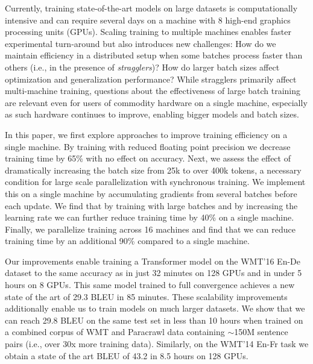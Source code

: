 \documentclass[11pt,a4paper]{article}
\newcommand{\mamark}[1]{\textcolor{orange}{{#1}}}
\begin{document}
Currently, training state-of-the-art models on large datasets is computationally intensive and can require several days on a machine with 8 high-end graphics processing units (GPUs). Scaling training to multiple machines enables faster experimental turn-around but also introduces new challenges:
How do we maintain efficiency in a distributed setup when some batches process faster than others (i.e., in the presence of \emph{stragglers})?
How do larger batch sizes affect optimization and generalization performance?
While stragglers primarily affect multi-machine training, questions about the effectiveness of large batch training are relevant even for users of commodity hardware on a single machine, especially as such hardware continues to improve, enabling bigger models and batch sizes.

In this paper, we first explore approaches to improve training efficiency on a single machine.
By training with reduced floating point precision we decrease training time by 65\% with no effect on accuracy.
Next, we assess the effect of dramatically increasing the batch size from 25k to over 400k tokens, a necessary condition for large scale parallelization with synchronous training.
We implement this on a single machine by accumulating gradients from several batches before each update.
We find that by training with large batches and by increasing the learning rate we can further reduce training time by 40\% on a single machine.
Finally, we parallelize training across 16 machines and find that we can reduce training time by an additional 90\% compared to a single machine.

Our improvements enable training a Transformer model on the WMT'16 En-De dataset to the same accuracy as \citet{vaswani2017transformer} in just 32 minutes on 128 GPUs and in under 5 hours on 8 GPUs.
This same model trained to full convergence achieves a new state of the art of 29.3 BLEU in 85 minutes.
These scalability improvements additionally enable us to train models on much larger datasets.
We show that we can reach 29.8 BLEU on the same test set in less than 10 hours when trained on a combined corpus of WMT and Paracrawl data containing $\sim$150M sentence pairs (i.e., over 30x more training data).
Similarly, on the WMT'14 En-Fr task we obtain a state of the art BLEU of 43.2 in 8.5 hours on 128 GPUs.
\end{document}

